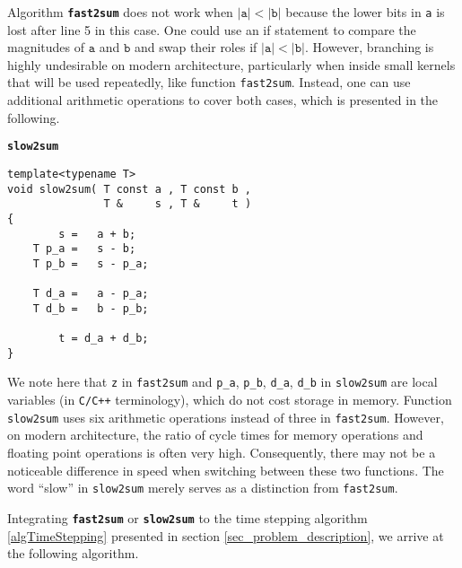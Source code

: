 \documentclass[10pt]{article}
\begin{document}
Algorithm \textbf{\texttt{\small fast2sum}} does not work when $\vert\texttt a\vert<\vert\texttt b\vert$ because the lower bits in \texttt{a} is lost after line 5 in this case. 
%
One could use an if statement to compare the magnitudes of $\texttt{a}$ and $\texttt{b}$ and swap their roles if $\vert\texttt a\vert<\vert\texttt b\vert$. 
%
However, branching is highly undesirable on modern architecture, particularly when inside small kernels that will be used repeatedly, like function \texttt{fast2sum}.
%
Instead, one can use additional arithmetic operations to cover both cases, which is presented in the following.


\begin{mdframed}[linewidth=0pt]
\textbf{\texttt{slow2sum}}
\newline
\begin{minipage}{\paperwidth}
\begin{lstlisting}[tabsize=4,basicstyle=\ttfamily\scriptsize]
template<typename T>
void slow2sum( T const a , T const b ,
               T &     s , T &     t )
{
	    s =   a + b;
	T p_a =   s - b;
	T p_b =   s - p_a;

	T d_a =   a - p_a;
	T d_b =   b - p_b;

	    t = d_a + d_b;
}
\end{lstlisting}
\end{minipage}
%
\end{mdframed}

We note here that \texttt{z} in \texttt{fast2sum} and \texttt{p\_a}, \texttt{p\_b}, \texttt{d\_a}, \texttt{d\_b} in \texttt{slow2sum} are local variables (in \texttt{C/C++} terminology), which do not cost storage in memory.
%
Function \texttt{slow2sum} uses six arithmetic operations instead of three in \texttt{fast2sum}.
%
However, on modern architecture, the ratio of cycle times for memory operations and floating point operations is often very high. Consequently, there may not be a noticeable difference in speed when switching between these two functions. 
%
The word ``slow'' in \texttt{slow2sum} merely serves as a distinction from \texttt{fast2sum}.
%


Integrating \textbf{\texttt{\small fast2sum}} or \textbf{\texttt{\small slow2sum}} to the time stepping algorithm \ref{algTimeStepping} presented in section \ref{sec_problem_description}, we arrive at the following algorithm.
\end{document}
